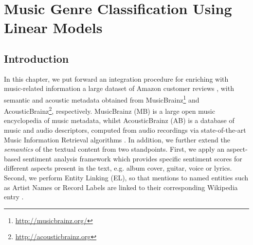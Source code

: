 
\chapter{Music Genre Classification Using Linear Models}
\label{sec:text-class}

\section{Introduction}
\label{sec:text-class:introduction}


In this chapter, we put forward an integration procedure for enriching with music-related information a large dataset of Amazon customer reviews \cite{McAuley2015a,McAuley2015}, with semantic and acoustic metadata obtained from MusicBrainz\footnote{\url{http://musicbrainz.org/}} and AcousticBrainz\footnote{\url{http://acousticbrainz.org}}, respectively. MusicBrainz (MB) is a large open music encyclopedia of music metadata, whilst AcousticBrainz (AB) is a database of music and audio descriptors, computed from audio recordings via state-of-the-art Music Information Retrieval algorithms \cite{Porter2015}.
In addition, we further extend the \textit{semantics} of the textual content from two standpoints. First, we apply an aspect-based sentiment analysis framework \cite{DongSOS13} which provides specific sentiment scores for different aspects present in the text, e.g. album cover, guitar, voice or lyrics. Second, we perform Entity Linking (EL), so that mentions to named entities such as Artist Names or Record Labels are linked to their corresponding Wikipedia entry \cite{Oramas2016}.

